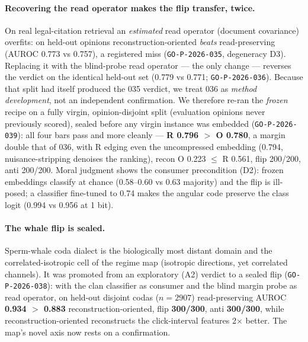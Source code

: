 \documentclass[10pt]{article} %
\theoremstyle{remark}
\newcommand{\seal}[1]{\texttt{GO-P-2026-#1}}
\begin{document}
\paragraph{Recovering the read operator makes the flip transfer, twice.} On real
legal-citation retrieval an \emph{estimated} read operator (document covariance) overfits:
on held-out opinions reconstruction-oriented \emph{beats} read-preserving (AUROC 0.773 vs
0.757), a registered miss (\seal{035}, degeneracy D3). Replacing it with the blind-probe
read operator --- the only change --- reverses the verdict on the identical held-out set
(0.779 vs 0.771; \seal{036}). Because that split had itself produced the 035 verdict, we
treat 036 as \emph{method development}, not an independent confirmation. We therefore re-ran
the \emph{frozen} recipe on a fully virgin,
opinion-disjoint split (evaluation opinions never previously scored), sealed before any
virgin instance was embedded (\seal{039}): all four bars pass and more cleanly ---
\textbf{R 0.796 $>$ O 0.780}, a margin double that of 036, with R edging even the
uncompressed embedding (0.794, nuisance-stripping denoises the ranking), recon
O 0.223 $\le$ R 0.561, flip 200/200, anti 200/200. Moral judgment shows the consumer
precondition (D2): frozen embeddings classify at chance (0.58--0.60 vs 0.63 majority) and
the flip is ill-posed; a classifier fine-tuned to 0.74 makes the angular code preserve the
class logit (0.994 vs 0.956 at 1 bit).

\paragraph{The whale flip is sealed.} Sperm-whale coda dialect is the biologically most
distant domain and the correlated-isotropic cell of the regime map (isotropic directions,
yet correlated channels). It was promoted from an exploratory (A2) verdict to
a sealed flip (\seal{038}): with the clan classifier as consumer and the blind margin
probe as read operator, on held-out disjoint codas ($n=2907$) read-preserving AUROC
\textbf{0.934 $>$ 0.883} reconstruction-oriented, flip \textbf{300/300}, anti
\textbf{300/300}, while reconstruction-oriented reconstructs the click-interval features
2$\times$ better. The map's novel axis now rests on a confirmation.
\end{document}
